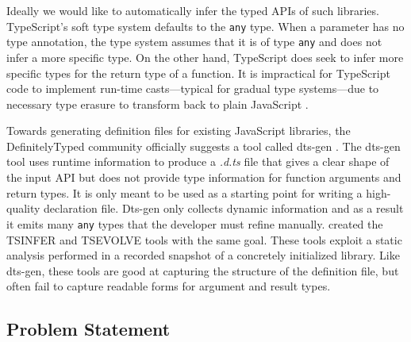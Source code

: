 \documentclass[sigplan,10pt,anonymous]{acmart} %
\newcommand{\margincomment}[2]{\marginpar{\scriptsize\color{Maroon}#1 says: #2}}
\newcommand{\adg}[1]{\margincomment{ADG}{#1}}
\theoremstyle{plain}
\theoremstyle{remark}
\theoremstyle{definition}
\begin{document}
Ideally we would like to automatically infer the typed APIs of such
libraries.
TypeScript's soft type system \citep{softtyping}
defaults to the \texttt{any} type.
When a parameter has no type annotation, the type system assumes that it is of type
\texttt{any} and does not infer a more specific type.
%
On the other hand, TypeScript does seek to infer more specific types for the return type of a function.
%
It is impractical for TypeScript code to implement run-time casts---typical for gradual type
systems---due to necessary type erasure to transform back to plain JavaScript \citep{understandtypescript}.

%
Towards generating definition files for existing JavaScript libraries,
the DefinitelyTyped
community officially suggests a tool called dts-gen \citep{dtsgen}.
The dts-gen tool uses runtime information to produce a \textit{.d.ts} file that gives a
clear shape of the input API but does not provide type information for
function arguments and return types.
It is only meant to be used as a starting
point for writing a high-quality declaration file. Dts-gen only collects
dynamic information and as a result it emits many \texttt{any} types that the developer must refine manually.
\citet{tstools2017} created the TSINFER and TSEVOLVE tools with the same goal.
These tools exploit a static analysis performed in a
recorded snapshot of a concretely initialized library.
Like dts-gen, these tools are good at capturing the structure of the definition file,
but often fail to capture readable forms for argument and result types.

\subsection{Problem Statement}\label{ssec:problem}
% 

\end{document}

